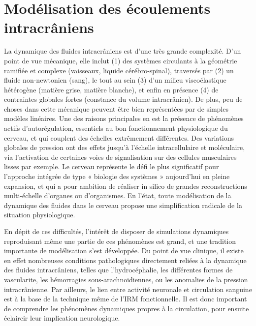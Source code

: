 
\chapter{Modélisation des écoulements intracrâniens}
	\minitoc

La dynamique des fluides intracrâniens est d'une très grande complexité. D'un point de vue
mécanique, elle inclut (1) des systèmes circulants à la géométrie ramifiée et complexe (vaisseaux,
liquide cérébro-spinal), traversés par (2) un fluide non-newtonien (sang), le tout au sein (3) d'un milieu
viscoélastique hétérogène (matière grise, matière blanche), et enfin en présence (4) de contraintes
globales fortes (constance du volume intracrânien). De plus, peu de choses dans cette mécanique
peuvent être bien représentées par de simples modèles linéaires. Une des raisons principales en est la
présence de phénomènes actifs d'autorégulation, essentiels au bon fonctionnement physiologique du
cerveau, et qui couplent des échelles extrêmement différentes. Des variations globales de pression ont
des effets jusqu'à l'échelle intracellulaire et moléculaire, via l'activation de certaines voies de
signalisation sur des cellules musculaires lisses par exemple. Le cerveau représente le défi le plus
significatif pour l'approche intégrée de type « biologie des systèmes » aujourd'hui en pleine expansion,
et qui a pour ambition de réaliser in silico de grandes reconstructions multi-échelle d'organes ou
d'organismes. En l'état, toute modélisation de la dynamique des fluides dans le cerveau propose une
simplification radicale de la situation physiologique.

En dépit de ces difficultés, l'intérêt de disposer de simulations dynamiques reproduisant même
une partie de ces phénomènes est grand, et une tradition importante de modélisation s'est
développée. Du point de vue clinique, il existe en effet nombreuses conditions pathologiques
directement reliées à la dynamique des fluides intracrâniens, telles que l'hydrocéphalie, les différentes
formes de vascularite, les hémorragies sous-arachnoïdiennes, ou les anomalies de la pression
intracrânienne. Par ailleurs, le lien entre activité neuronale et circulation sanguine est à la base de la
technique même de l'IRM fonctionnelle. Il est donc important de comprendre les phénomènes
dynamiques propres à la circulation, pour ensuite éclaircir leur implication neurologique.

